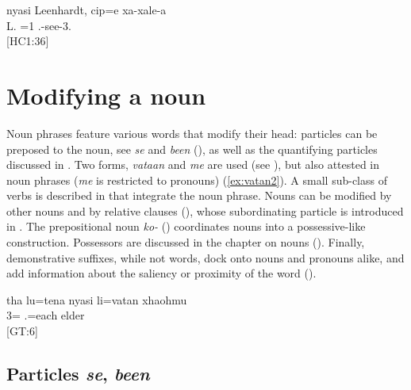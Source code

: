 \ea\label{ex:nyasi}
\gll nyasi Leenhardt, cip=e xa-xale-a\\
  L. =1 .-see-3.\\
\glt {} {[HC1:36]}
\z

  \section{Modifying a noun}
  \label{sec:ModNoun}
Noun phrases feature various words that modify their head: particles can be preposed to the noun, see \textit{se} and \textit{been}  (), as well as the quantifying particles discussed in . Two forms, \textit{vataan}  and \textit{me}  are used (see ), but also attested in noun phrases (\textit{me} is restricted to pronouns) (\ref{ex:vatan2}). A small sub-class of verbs is described in  that integrate the noun phrase. Nouns can be modified by other nouns and by relative clauses (), whose subordinating particle is introduced in . The prepositional noun \textit{ko-}  () coordinates nouns into a possessive-like construction. %
Possessors are discussed in the chapter on nouns (). Finally, demonstrative suffixes, while not words, dock onto nouns and pronouns alike, and add information about the saliency or proximity of the word ().

\ea \label{ex:vatan2}
\gll tha lu=tena nyasi li=vatan xhaohmu\\
  3= .=each elder\\
\glt {} {[GT:6]}
\z

\subsection{Particles \textit{se}, \textit{been} }
\label{sec:ise}  

